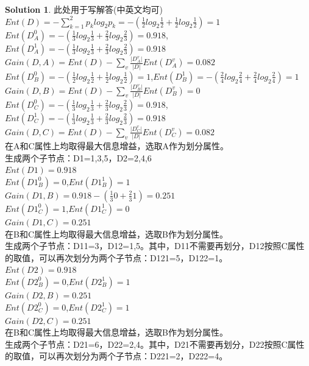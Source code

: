 \documentclass[a4paper,UTF8]{article}
\numberwithin{equation}{section}
\theoremstyle{definition}
\newtheorem*{solution}{Solution}
\begin{document}
\begin{solution}
此处用于写解答(中英文均可)\\
$Ent(D)=-\sum_{k=1}^2 p_k log_2 p_k = - (\frac{1}{2} log_2 \frac{1}{2} + \frac{1}{2} log_2 \frac{1}{2}) = 1$\\
$Ent(D^0_A) = -(\frac{1}{3} log_2 \frac{1}{3} + \frac{2}{3} log_2 \frac{2}{3}) = 0.918$,$Ent(D^1_A) = -(\frac{1}{3} log_2 \frac{1}{3} + \frac{2}{3} log_2 \frac{2}{3}) = 0.918$\\
$Gain(D,A) = Ent(D) - \sum_v\frac{\vert D^v_A \vert}{\vert D \vert} Ent(D^v_A)=0.082$\\
$Ent(D^0_B) = -(\frac{1}{2} log_2 \frac{1}{2} + \frac{1}{2} log_2 \frac{1}{2}) = 1$,$Ent(D^1_B) = -(\frac{2}{4} log_2 \frac{2}{4} + \frac{2}{4} log_2 \frac{2}{4}) = 1$\\
$Gain(D,B) = Ent(D) - \sum_v\frac{\vert D^v_B \vert}{\vert D \vert} Ent(D^v_B)=0$\\
$Ent(D^0_C) = -(\frac{1}{3} log_2 \frac{1}{3} + \frac{2}{3} log_2 \frac{2}{3}) = 0.918$,$Ent(D^1_C) = -(\frac{1}{3} log_2 \frac{1}{3} + \frac{2}{3} log_2 \frac{2}{3}) = 0.918$\\
$Gain(D,C) = Ent(D) - \sum_v\frac{\vert D^v_C \vert}{\vert D \vert} Ent(D^v_C)=0.082$\\
在A和C属性上均取得最大信息增益，选取A作为划分属性。\\
生成两个子节点：D1={1,3,5}，D2={2,4,6}\\
$Ent(D1)=0.918$\\
$Ent(D1^0_B) = 0$,$Ent(D1^1_B) = 1$\\
$Gain(D1,B)=0.918-(\frac{1}{3} 0 + \frac{2}{3} 1) = 0.251$\\
$Ent(D1^0_C) = 1$,$Ent(D1^1_C) = 0$\\
$Gain(D1,C)=0.251$\\
在B和C属性上均取得最大信息增益，选取B作为划分属性。\\
生成两个子节点：D11={3}，D12={1,5}。其中，D11不需要再划分，D12按照C属性的取值，可以再次划分为两个子节点：D121={5}，D122={1}。\\
$Ent(D2)=0.918$\\
$Ent(D2^0_B) = 0$,$Ent(D2^1_B)=1$\\
$Gain(D2,B)=0.251$\\
$Ent(D2^0_C) = 0$,$Ent(D2^1_C)=1$\\
$Gain(D2,C)=0.251$\\
在B和C属性上均取得最大信息增益，选取B作为划分属性。\\
生成两个子节点：D21={6}，D22={2,4}。其中，D21不需要再划分，D22按照C属性的取值，可以再次划分为两个子节点：D221={2}，D222={4}。\\

\end{solution}
\end{document}

